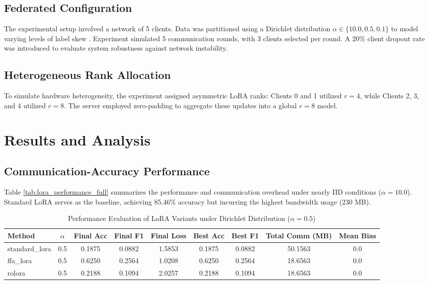 \documentclass[journal]{IEEEtran}
\begin{document}
\subsection{Federated Configuration}

The experimental setup involved a network of 5 clients. Data was partitioned using a Dirichlet distribution $\alpha \in \{10.0, 0.5, 0.1\}$ to model varying levels of label skew \cite{zhao2018federated}. 
Experiment simulated 5 communication rounds, with 3 clients selected per round. A 20\% client dropout rate was introduced to evaluate system robustness against network instability.

\subsection{Heterogeneous Rank Allocation}
To simulate hardware heterogeneity, the experiment assigned asymmetric LoRA ranks: Clients 0 and 1 utilized $r=4$, while Clients 2, 3, and 4 utilized $r=8$. The server employed zero-padding to aggregate these updates into a global $r=8$ model.



\section{Results and Analysis}
\subsection{Communication-Accuracy Performance}
Table \ref{tab:lora_performance_full} summarizes the performance and communication overhead under nearly IID conditions ($\alpha=10.0$). Standard LoRA serves as the baseline, achieving 85.46\% accuracy but incurring the highest bandwidth usage (230 MB).

\begin{table}[htbp] %
\centering
\caption{Performance Evaluation of LoRA Variants under Dirichlet Distribution ($\alpha = 0.5$)}
\label{tab:lora_variants_comparison}
\begin{tabular}{lcccccccc}
\toprule
Method & $\alpha$ & Final Acc & Final F1 & Final Loss & Best Acc & Best F1 & Total Comm (MB) & Mean Bias \\ 
\midrule
standard\_lora & 0.5 & 0.1875 & 0.0882 & 1.5853 & 0.1875 & 0.0882 & 50.1563 & 0.0 \\
ffa\_lora      & 0.5 & 0.6250 & 0.2564 & 1.0208 & 0.6250 & 0.2564 & 18.6563 & 0.0 \\
rolora        & 0.5 & 0.2188 & 0.1094 & 2.0257 & 0.2188 & 0.1094 & 18.6563 & 0.0 \\ 
\bottomrule
\end{tabular}
\end{table}
\end{document}
